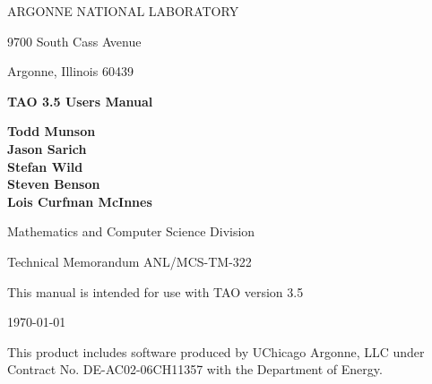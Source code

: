 
\vspace{1.75in}

\begin{center}

ARGONNE NATIONAL LABORATORY

9700 South Cass Avenue

Argonne, Illinois  60439

\vspace{1.5in}

{\Large
{\bf 
TAO 3.5 Users Manual
}
}

\vspace{.5in}

{\bf Todd Munson \\ Jason Sarich \\ Stefan Wild \\ Steven Benson \\ Lois Curfman McInnes}

\vspace{.5in}

Mathematics and Computer Science Division

\vspace{.25in}

Technical Memorandum ANL/MCS-TM-322

\vspace{.25in}

This manual is intended for use with TAO version 3.5

\vspace{1.0in}

\today
\end{center}

\vspace{0.75in}

\par\noindent
This product includes software produced by UChicago Argonne, LLC under 
Contract No. DE-AC02-06CH11357 with the Department of Energy.
